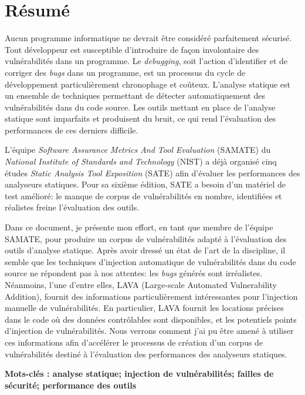 {}
\section*{Résumé}

\vspace{-0.3cm}

\begin{small}
    Aucun programme informatique ne devrait être considéré parfaitement sécurisé. Tout dévelop\-peur est susceptible d'introduire de façon involontaire des vulnérabilités dans un programme. Le \emph{debugging}, soit l'action d'identifier et de corriger des \emph{bugs} dans un programme, est un processus du cycle de développement particulièrement chronophage et coûteux. L'analyse statique est un ensemble de techniques permettant de détecter automatiquement des vulnérabilités dans du code source. Les outils mettant en place de l'analyse statique sont imparfaits et produisent du bruit, ce qui rend l'évaluation des performances de ces derniers difficile.
    
    L'équipe \emph{Software Assurance Metrics And Tool Evaluation} (SAMATE) du \emph{National Institute of Standards and Technology} (NIST) a déjà organisé cinq études \emph{Static Analysis Tool Exposition} (SATE) afin d'évaluer les performances des analyseurs statiques. Pour sa sixième édition, SATE a besoin d'un matériel de test amélioré: le manque de corpus de vulnérabilités en nombre, identifiées et réalistes freine l'évaluation des outils.
    
    Dans ce document, je présente mon effort, en tant que membre de l'équipe SAMATE, pour produire un corpus de vulnérabilités adapté à l'évaluation des outils d'analyse statique. Après avoir dressé un état de l'art de la discipline, il semble que les techniques d'injection automatique de vulnérabilités dans du code source ne répondent pas à nos attentes: les \emph{bugs} générés sont irréalistes. Néanmoins, l'une d'entre elles, LAVA (Large-scale Automated Vulnerability Addition), fournit des informations particulièrement intéressantes pour l'injection manuelle de vulnérabilités. En particulier, LAVA fournit les locations précises dans le code où des données contrôlables sont disponibles, et les potentiels points d'injection de vulnérabilités. Nous verrons comment j'ai pu être amené à utiliser ces informations afin d'accélérer le processus de création d'un corpus de vulnérabilités destiné à l'évaluation des performances des analyseurs statiques.
    
    {\bf Mots-clés : analyse statique; injection de vulnérabilités; failles de sécurité; performance des outils}
\end{small}
